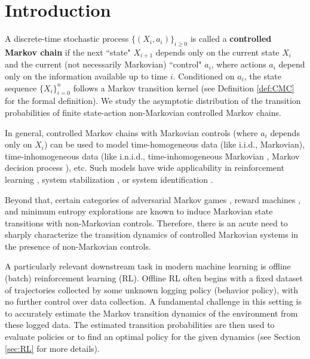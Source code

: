 \documentclass[twoside,11pt]{article}
\numberwithin{equation}{section}
\begin{document}
\section{Introduction}
A discrete-time stochastic process $\{(X_i, a_i)\}_{i \geq 0}$ is called a \textbf{controlled Markov chain} \citep{borkar1991topics} if the next ``state" $X_{i+1}$ depends only on the current state $X_i$ and the current (not necessarily Markovian) ``control" $a_i$, where actions $a_i$ depend only on the information available up to time $i$. 
Conditioned on $a_i$, the state sequence $\{X_i\}_{i=0}^n$ follows a Markov transition kernel (see Definition \ref{def:CMC} for the formal definition). 
We study the asymptotic distribution of the transition probabilities of finite state-action non-Markovian controlled Markov chains.

In general, controlled Markov chains with Markovian controls (where $a_i$ depends only on $X_i$) can be used to model time-homogeneous data (like i.i.d., Markovian), time-inhomogeneous data (like i.n.i.d., time-inhomogeneous Markovian \citep{dolgopyat_local_2023,merlevede_local_2022}, Markov decision process \citep{hernandez-lerma_recurrence_1991}), etc. 
Such models have wide applicability in reinforcement learning \citep{sutton2018reinforcement}, system stabilization \citep{yu_online_2023}, or system identification \citep{ljung_system_1999,mania_active_2020}. 

Beyond that, certain categories of adversarial Markov games \citep{wang_foundation_2024}, reward machines \citep{icarte_using_2018}, and minimum entropy explorations \citep{mutti_importance_2022} are known to induce Markovian state transitions with non-Markovian controls.  
Therefore, there is an acute need to sharply characterize the transition dynamics of controlled Markovian systems in the presence of non-Markovian controls. 

A particularly relevant downstream task in modern machine learning is offline (batch) reinforcement learning (RL).
Offline RL often begins with a fixed dataset of trajectories collected by some unknown logging policy (behavior policy), with no further control over data collection.
A fundamental challenge in this setting is to accurately estimate the Markov transition dynamics of the environment from these logged data. 
The estimated transition probabilities are then used to evaluate policies or to find an optimal policy for the given dynamics (see Section \ref{sec:RL} for more details). 

 
\end{document}
